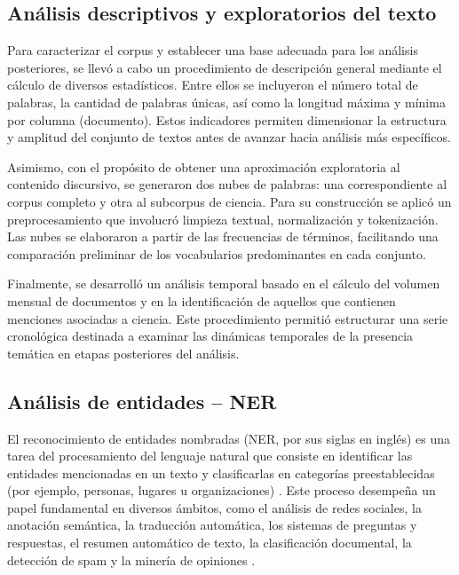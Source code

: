 \documentclass[11pt,a4paper]{article}
\begin{document}
	\subsection{Análisis descriptivos y exploratorios del texto}
	
	
	Para caracterizar el corpus y establecer una base adecuada para los análisis posteriores, se llevó a cabo un procedimiento de descripción general mediante el cálculo de diversos estadísticos. Entre ellos se incluyeron el número total de palabras, la cantidad de palabras únicas, así como la longitud máxima y mínima por columna (documento). Estos indicadores permiten dimensionar la estructura y amplitud del conjunto de textos antes de avanzar hacia análisis más específicos.
	
	Asimismo, con el propósito de obtener una aproximación exploratoria al contenido discursivo, se generaron dos nubes de palabras: una correspondiente al corpus completo y otra al subcorpus de ciencia. Para su construcción se aplicó un preprocesamiento que involucró limpieza textual, normalización y tokenización. Las nubes se elaboraron a partir de las frecuencias de términos, facilitando una comparación preliminar de los vocabularios predominantes en cada conjunto.
	
	Finalmente, se desarrolló un análisis temporal basado en el cálculo del volumen mensual de documentos y en la identificación de aquellos que contienen menciones asociadas a ciencia. Este procedimiento permitió estructurar una serie cronológica destinada a examinar las dinámicas temporales de la presencia temática en etapas posteriores del análisis.
	
	
	
	\subsection{Análisis de entidades – NER}
	El reconocimiento de entidades nombradas (NER, por sus siglas en inglés) es una tarea del procesamiento del lenguaje natural que consiste en identificar las entidades mencionadas en un texto y clasificarlas en categorías preestablecidas (por ejemplo, personas, lugares u organizaciones) \cite{Jehangir2023}. Este proceso desempeña un papel fundamental en diversos ámbitos, como el análisis de redes sociales, la anotación semántica, la traducción automática, los sistemas de preguntas y respuestas, el resumen automático de texto, la clasificación documental, la detección de spam y la minería de opiniones \cite{Jehangir2023}.
	
\end{document}
